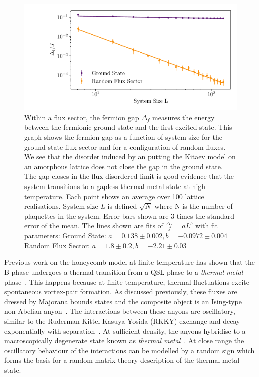 \hypertarget{fig:fermion_gap_vs_L}{%
\begin{figure}
\centering
\includegraphics[width=1\textwidth,height=\textheight]{figure_code/amk_chapter/results/fermion_gap_vs_L/fermion_gap_vs_L}
\caption[{Finite Size Scaing of the Fermion Gap}]{Within a flux sector, the fermion gap \(\Delta_f\) measures the energy between the fermionic ground state and the first excited state. This graph shows the fermion gap as a function of system size for the ground state flux sector and for a configuration of random fluxes. We see that the disorder induced by an putting the Kitaev model on an amorphous lattice does not close the gap in the ground state. The gap closes in the flux disordered limit is good evidence that the system transitions to a gapless thermal metal state at high temperature. Each point shows an average over 100 lattice realisations. System size \(L\) is defined \(\sqrt{N}\) where N is the number of plaquettes in the system. Error bars shown are \(3\) times the standard error of the mean. The lines shown are fits of \(\tfrac{\Delta_f}{J} = aL ^ b\) with fit parameters: Ground State: \(a = 0.138 \pm 0.002, b = -0.0972 \pm 0.004\) Random Flux Sector: \(a = 1.8 \pm 0.2, b = -2.21 \pm 0.03\)}
\label{fig:fermion_gap_vs_L}
\end{figure}
}

Previous work on the honeycomb model at finite temperature has shown that the B phase undergoes a thermal transition from a QSL phase to a \emph{thermal metal} phase~\autocite{selfThermallyInducedMetallic2019}. This happens because at finite temperature, thermal fluctuations excite spontaneous vortex-pair formation. As discussed previously, these fluxes are dressed by Majorana bounds states and the composite object is an Ising-type non-Abelian anyon~\autocite{Beenakker2013}. The interactions between these anyons are oscillatory, similar to the Ruderman-Kittel-Kasuya-Yosida (RKKY) exchange and decay exponentially with separation~\autocite{Laumann2012,Lahtinen_2011,lahtinenTopologicalLiquidNucleation2012}. At sufficient density, the anyons hybridise to a macroscopically degenerate state known as \emph{thermal metal}~\autocite{Laumann2012}. At close range the oscillatory behaviour of the interactions can be modelled by a random sign which forms the basis for a random matrix theory description of the thermal metal state.

